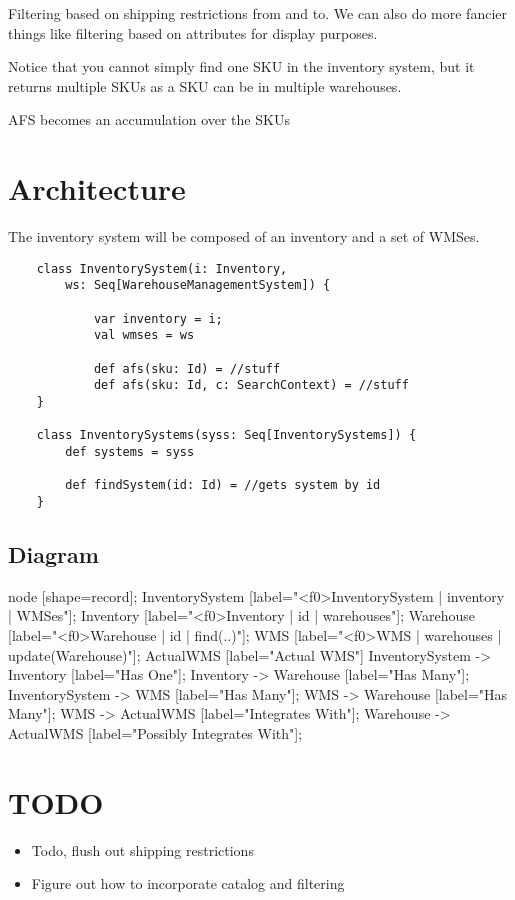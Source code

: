 \documentclass[11pt]{article}
\begin{document}
Filtering based on shipping restrictions from and to. We can also do more fancier
things like filtering based on attributes for display purposes.

Notice that you cannot simply find one SKU in the inventory system, but it returns multiple
SKUs as a SKU can be in multiple warehouses.

AFS becomes an accumulation over the SKUs

\section{Architecture}

The inventory system will be composed of an inventory and a set of WMSes. 

\begin{lstlisting}
    class InventorySystem(i: Inventory, 
        ws: Seq[WarehouseManagementSystem]) {

            var inventory = i;
            val wmses = ws

            def afs(sku: Id) = //stuff
            def afs(sku: Id, c: SearchContext) = //stuff
    }

    class InventorySystems(syss: Seq[InventorySystems]) {
        def systems = syss

        def findSystem(id: Id) = //gets system by id
    }

\end{lstlisting}

\subsection{Diagram}
 {
    node [shape=record];
    InventorySystem [label="<f0>InventorySystem | {inventory | WMSes}"];
    Inventory [label="<f0>Inventory | {id | warehouses}"];
    Warehouse [label="<f0>Warehouse | {id | find(..)}"];
    WMS [label="<f0>WMS | {warehouses | update(Warehouse)}"];
    ActualWMS [label="Actual WMS"]
    InventorySystem -> Inventory [label="Has One"];
    Inventory -> Warehouse [label="Has Many"];
    InventorySystem -> WMS [label="Has Many"];
    WMS -> Warehouse [label="Has Many"];
    WMS -> ActualWMS [label="Integrates With"];
    Warehouse -> ActualWMS [label="Possibly Integrates With"];
}

\section{TODO}

\begin{itemize}
    \item Todo, flush out shipping restrictions
    \item Figure out how to incorporate catalog and filtering
\end{itemize}
\end{document}
